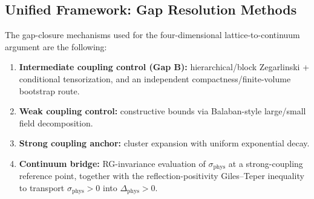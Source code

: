 \subsection{Unified Framework: Gap Resolution Methods}
\label{subsec:four-gaps-unified}

\begin{remark}
\label{rem:rigorous-gap-closure-summary}
The gap-closure mechanisms used for the four-dimensional lattice-to-continuum argument 
are the following:
\begin{enumerate}[label=(\roman*)]
\item \textbf{Intermediate coupling control (Gap B):} hierarchical/block Zegarlinski + conditional 
tensorization, and an independent compactness/finite-volume bootstrap route.

\item \textbf{Weak coupling control:} constructive bounds via Balaban-style 
large/small field decomposition.

\item \textbf{Strong coupling anchor:} cluster expansion with uniform exponential decay.

\item \textbf{Continuum bridge:} RG-invariance evaluation of $\sigma_{\mathrm{phys}}$ at a strong-coupling 
reference point, together with the reflection-positivity Giles--Teper inequality 
to transport $\sigma_{\mathrm{phys}}>0$ into $\Delta_{\mathrm{phys}}>0$.
\end{enumerate}
\end{remark}






